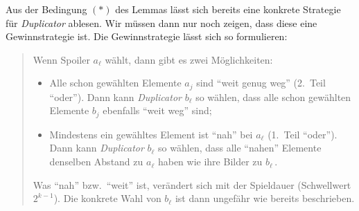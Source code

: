 \documentclass[fontsize=11pt, twoside=false, numbers=autoenddot]{scrbook}
\begin{document}
Aus der Bedingung $(*)$ des Lemmas lässt sich bereits eine konkrete Strategie für \emph{Duplicator} ablesen.
Wir müssen dann nur noch zeigen, dass diese eine Gewinnstrategie ist.
Die Gewinnstrategie lässt sich so formulieren: 
%
\begin{quote}
  Wenn Spoiler $a_\ell$ wählt, dann gibt es zwei Möglichkeiten:
  \begin{itemize}
    \item
      Alle schon gewählten Elemente $a_j$ sind "`weit genug weg"' (2.\ Teil "`oder"').
      Dann kann \emph{Duplicator} $b_\ell$ so wählen, dass alle schon gewählten Elemente $b_j$ ebenfalls "`weit weg"' sind;
    \item
      Mindestens ein gewähltes Element ist "`nah"' bei $a_\ell$ (1.\ Teil "`oder"').
      Dann kann \emph{Duplicator} $b_\ell$ so wählen, dass alle "`nahen"' Elemente denselben Abstand zu $a_\ell$ haben wie ihre Bilder zu $b_\ell$\,.
  \end{itemize}
  Was "`nah"' bzw.\ "`weit"' ist, verändert sich mit der Spieldauer (Schwellwert $2^{k-1}$).
  Die konkrete Wahl von $b_\ell$ ist dann ungefähr wie bereits beschrieben.
\end{quote}
%
\end{document}
